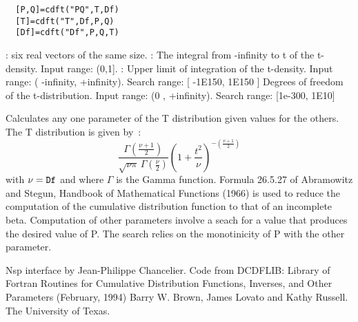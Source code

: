 \begin{mandesc}
\end{mandesc}
\label{cdft}
\begin{calling_sequence}
\begin{verbatim}
  [P,Q]=cdft("PQ",T,Df)  
  [T]=cdft("T",Df,P,Q)  
  [Df]=cdft("Df",P,Q,T)  
\end{verbatim}
\end{calling_sequence}
\begin{parameters}
  \begin{varlist}
     : six real vectors of the same size.
     : The integral from -infinity to t of the t-density. Input range: (0,1].
       : Upper limit of integration of the t-density. Input range: ( -infinity, +infinity). Search range: [ -1E150, 1E150 ]
       Degrees of freedom of the t-distribution. Input range: (0 , +infinity). Search range: [1e-300, 1E10]
  \end{varlist}
\end{parameters}
\begin{mandescription}
  Calculates any one parameter of the T distribution given
  values for the others. The T distribution is given by~:
  \begin{equation}
    \frac{\Gamma(\frac{\nu+1}{2})} {\sqrt{\nu\pi}\,\Gamma(\frac{\nu}{2})} \left(1+\frac{t^2}{\nu} \right)^{-(\frac{\nu+1}{2})} 
  \end{equation}
  with $\nu = \mbox{\tt Df}$  and where $\Gamma$ is the Gamma function.
  Formula  26.5.27  of   Abramowitz   and  Stegun,   Handbook   of
  Mathematical Functions  (1966) is used to reduce the computation
  of the cumulative distribution function to that of an incomplete
  beta.
  Computation of other parameters involve a seach for a value that
  produces  the desired  value  of P.   The search relies  on  the
  monotinicity of P with the other parameter.
\end{mandescription}

\begin{program}
\end{program}


\begin{authors}
  Nsp interface by Jean-Philippe Chancelier. Code from DCDFLIB: 
  Library of Fortran Routines for Cumulative Distribution
  Functions, Inverses, and Other Parameters (February, 1994)
  Barry W. Brown, James Lovato and Kathy Russell. The University of Texas.
\end{authors}
